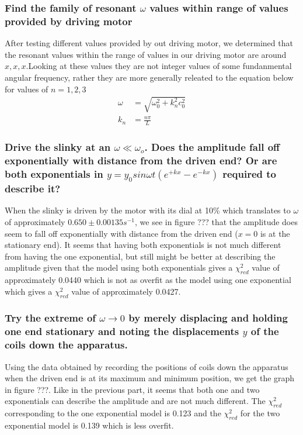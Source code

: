 \documentclass{article}
\begin{document}
\subsubsection*{Find the family of resonant $\omega$ values within range of
values provided by driving motor}
After testing different values provided by out driving motor, we determined that
the resonant values within the range of values in our driving motor are around
$x, x, x$.Looking at these values they are not integer values of some
fundanmental angular frequency, rather they are more generally releated to the
equation below for values of $n = 1,2,3$
\begin{align*}
    \omega &= \sqrt{\omega_0^2 + k_n^2c_0^2}\\
    k_n &= \frac{n\pi}{L}
\end{align*}

\subsubsection*{Drive the slinky at an $\omega\ll\omega_{o}$.  
Does the amplitude fall off exponentially with distance
from the driven end?  Or are both exponentials in $y=y_{0}sin\omega 
t(e^{+kx}-e^{-kx})$ required to describe it?}
When the slinky is driven by the motor with its dial at 10\% which translates 
to $\omega$ of approximately $0.650\pm0.00135s^{-1}$, we see in figure ??? 
that the amplitude does seem to fall off exponentially with distance from
the driven end ($x=0$ is at the stationary end).  It seems that having both
exponentials is not much different from having the one exponential, but still 
might be better at describing the amplitude given that the model using both 
exponentials gives a $\chi_{red}^{2}$ value of approximately 0.0440 which is not 
as overfit as the model using one exponential which gives a $\chi_{red}^{2}$ 
value of approximately 0.0427.

\subsubsection*{Try the extreme of $\omega\rightarrow0$ by merely displacing 
and holding one end stationary and noting the displacements $y$ of the coils 
down the apparatus.}
Using the data obtained by recording the positions of coils down the apparatus 
when the driven end is at its maximum and minimum position, we get the graph in
figure ???.  Like in the previous part, it seems that both one and two 
exponentials can describe the amplitude and are not much different.  The 
$\chi_{red}^{2}$ corresponding to the one exponential model is 0.123 and the
$\chi_{red}^{2}$ for the two exponential model is 0.139 which is less overfit.
\end{document}

